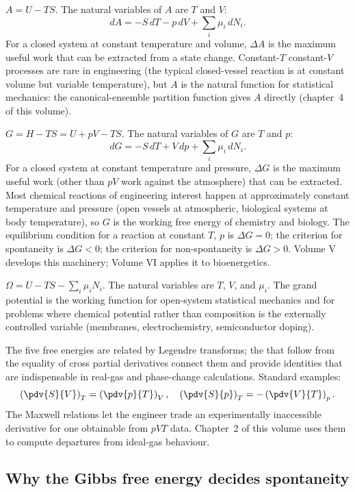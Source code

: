  $A = U - TS$. The natural variables of
$A$ are $T$ and $V$:
\[
dA = -S \,dT - p \,dV + \sum_i \mu_i \,dN_i.
\]
For a closed system at constant temperature and volume, $\Delta A$ is
the maximum useful work that can be extracted from a state change.
Constant-$T$ constant-$V$ processes are rare in engineering (the
typical closed-vessel reaction is at constant volume but variable
temperature), but $A$ is the natural function for statistical
mechanics: the canonical-ensemble partition function gives $A$
directly (chapter~4 of this volume).

 $G = H - TS = U + pV - TS$. The natural
variables of $G$ are $T$ and $p$:
\[
dG = -S \,dT + V \,dp + \sum_i \mu_i \,dN_i.
\]
For a closed system at constant temperature and pressure, $\Delta G$
is the maximum useful work (other than $pV$ work against the
atmosphere) that can be extracted. Most chemical reactions of
engineering interest happen at approximately constant temperature and
pressure (open vessels at atmospheric, biological systems at body
temperature), so $G$ is the working free energy of chemistry and
biology. The equilibrium condition for a reaction at constant $T$, $p$
is $\Delta G = 0$; the criterion for spontaneity is $\Delta G < 0$;
the criterion for non-spontaneity is $\Delta G > 0$. Volume V develops
this machinery; Volume VI applies it to bioenergetics.

 $\Omega = U - TS - \sum_i \mu_i N_i$. The
natural variables are $T$, $V$, and $\mu_i$. The grand potential is
the working function for open-system statistical mechanics and for
problems where chemical potential rather than composition is the
externally controlled variable (membranes, electrochemistry,
semiconductor doping).

The five free energies are related by Legendre transforms; the
 that follow from the equality of cross
partial derivatives connect them and provide identities that are
indispensable in real-gas and phase-change calculations. Standard
examples:
\[
\left(\pdv{S}{V}\right)_T = \left(\pdv{p}{T}\right)_V, \quad
\left(\pdv{S}{p}\right)_T = -\left(\pdv{V}{T}\right)_p.
\]
The Maxwell relations let the engineer trade an experimentally
inaccessible derivative for one obtainable from $pVT$ data. Chapter~2
of this volume uses them to compute departures from ideal-gas
behaviour.

\subsection{Why the Gibbs free energy decides spontaneity}

